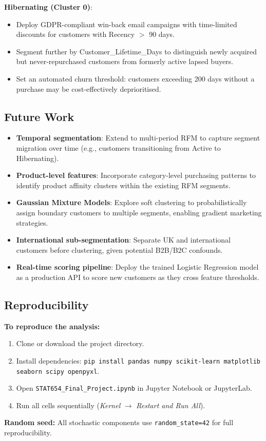 \documentclass[10pt,a4paper]{article}
\begin{document}
\textbf{Hibernating (Cluster 0)}:
\begin{itemize}[leftmargin=*,noitemsep]
  \item Deploy GDPR-compliant win-back email campaigns with time-limited discounts
        for customers with Recency $>$ 90 days.
  \item Segment further by Customer\_Lifetime\_Days to distinguish newly acquired but
        never-repurchased customers from formerly active lapsed buyers.
  \item Set an automated churn threshold: customers exceeding 200 days without a
        purchase may be cost-effectively deprioritised.
\end{itemize}

\subsection{Future Work}

\begin{itemize}[leftmargin=*]
  \item \textbf{Temporal segmentation}: Extend to multi-period RFM to capture
        segment migration over time (e.g., customers transitioning from Active to
        Hibernating).
  \item \textbf{Product-level features}: Incorporate category-level purchasing patterns
        to identify product affinity clusters within the existing RFM segments.
  \item \textbf{Gaussian Mixture Models}: Explore soft clustering to probabilistically
        assign boundary customers to multiple segments, enabling gradient marketing strategies.
  \item \textbf{International sub-segmentation}: Separate UK and international
        customers before clustering, given potential B2B/B2C confounds.
  \item \textbf{Real-time scoring pipeline}: Deploy the trained Logistic Regression
        model as a production API to score new customers as they cross feature thresholds.
\end{itemize}

\subsection{Reproducibility}

\textbf{To reproduce the analysis:}
\begin{enumerate}[leftmargin=*]
  \item Clone or download the project directory.
  \item Install dependencies: \texttt{pip install pandas numpy scikit-learn
        matplotlib seaborn scipy openpyxl}.
  \item Open \texttt{STAT654\_Final\_Project.ipynb} in
        Jupyter Notebook or JupyterLab.
  \item Run all cells sequentially (\textit{Kernel} $\to$ \textit{Restart and Run All}).
\end{enumerate}

\textbf{Random seed:} All stochastic components use \texttt{random\_state=42}
for full reproducibility.

\printbibliography[heading=bibintoc,title={References}]
\end{document}
